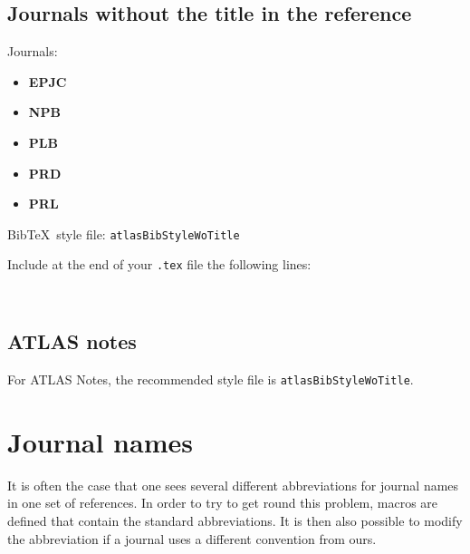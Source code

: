 \documentclass[UKenglish]{latex/atlasdoc}
\newcommand*{\BibTeX}{Bib\TeX}
\newcommand{\File}[1]{\texttt{#1}\xspace}
\newcommand{\Package}[1]{\texttt{#1}\xspace}
\begin{document}
\subsection{Journals without the title in the reference}
\label{sec:wotitle}

Journals:
\begin{itemize}\setlength{\parskip}{0pt}\setlength{\itemsep}{0pt}
\item \textbf{EPJC}
\item \textbf{NPB}
\item \textbf{PLB}
\item \textbf{PRD}
\item \textbf{PRL}
\end{itemize}

\noindent \BibTeX\ style file: \Package{atlasBibStyleWoTitle}

\noindent Include at the end of your \File{.tex} file the following lines:
\begin{verbatim}


\end{verbatim}


\subsection{ATLAS notes}

For ATLAS Notes, the recommended style file is \File{atlasBibStyleWoTitle}.


\section{Journal names}

It is often the case that one sees several different abbreviations for journal
names in one set of references.
In order to try to get round this problem, macros are defined that
contain the standard abbreviations.
It is then also possible to modify the abbreviation if a journal uses a different convention from ours.
\end{document}
